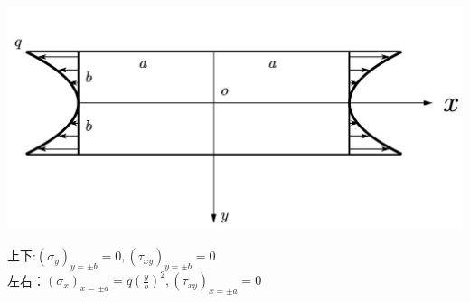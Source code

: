 \begin{example}
\end{example}
\centerline{\includegraphics[scale=0.5]{figure/2-4.png}}
\begin{remark}
	上下:$\left( \sigma _y \right) _{y=\pm b}=0,\left( \tau _{xy} \right) _{y=\pm b}=0$\\
	左右：$\left( \sigma _x \right) _{x=\pm a}=q\left( \frac{y}{b} \right) ^2,\left( \tau _{xy} \right) _{x=\pm a}=0$
\end{remark}

